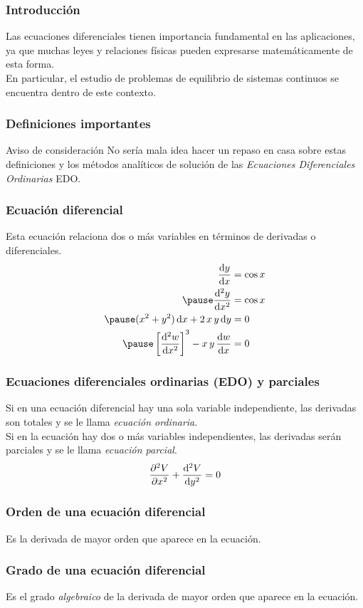 \documentclass[12pt]{beamer}
\begin{document}
\begin{frame}
\frametitle{Introducción}
Las ecuaciones diferenciales tienen importancia fundamental en las aplicaciones, ya que muchas leyes y relaciones físicas pueden expresarse matemáticamente de esta forma.
\\
\medskip
\pause
En particular, el estudio de problemas de equilibrio de sistemas continuos se encuentra dentro de este contexto.
\end{frame}
\begin{frame}
\frametitle{Definiciones importantes}
\begin{block}{Aviso de consideración}
No sería mala idea hacer un repaso en casa sobre estas definiciones y los métodos analíticos de solución de las	\textit{Ecuaciones Diferenciales Ordinarias} EDO.
\end{block}
\end{frame}
\begin{frame}
\frametitle{Ecuación diferencial}
Esta ecuación relaciona dos o más variables en términos de derivadas o diferenciales.
\pause
\begin{eqnarray*}
\begin{aligned}
\dv{y}{x} &= \cos x \\ \pause
\dv[2]{y}{x} &= \cos x \\ \pause
( x^{2} + y^{2} ) \dd{x} + 2 \, x \, y \dd{y} &= 0 \\ \pause
\left[ \dv[2]{w}{x} \right]^{3} - x \, y \, \dv{w}{x} &= 0 
\end{aligned}
\end{eqnarray*}
\end{frame}
\begin{frame}
\frametitle{Ecuaciones diferenciales ordinarias (EDO) y parciales}
Si en una ecuación diferencial hay una sola variable independiente, las derivadas son totales y se le llama \textit{ecuación ordinaria}.
\\
\medskip
\pause
Si en la ecuación hay dos o más variables independientes, las derivadas serán parciales y se le llama \textit{ecuación parcial}.
\begin{align*}
\pdv[2]{V}{x} + \dv[2]{V}{y} = 0
\end{align*}
\end{frame}
\begin{frame}
\frametitle{Orden de una ecuación diferencial}
Es la derivada de mayor orden que aparece en la ecuación.
\end{frame}
\begin{frame}
\frametitle{Grado de una ecuación diferencial}
Es el grado \textit{algebraico} de la derivada de mayor orden que aparece en la ecuación.
\end{frame}
\end{document}
